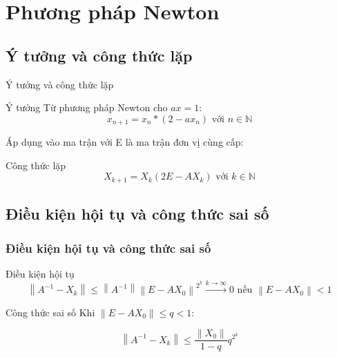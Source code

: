 \section{Phương pháp Newton}
\subsection{Ý tưởng và công thức lặp}
    \begin{frame}{Ý tưởng và công thức lặp}

        \begin{block}{Ý tưởng}
            Từ phương pháp Newton cho $ax = 1$:
            $$ x_{n+1} = x_{n} * (2 - ax_{n}) \text{ với } n \in \mathbb{N} $$
        \end{block}

        Áp dụng vào ma trận với E là ma trận đơn vị cùng cấp:
        \begin{block}{Công thức lặp}
            $$ X_{k+1} = X_{k}(2E - AX_{k}) \text{ với } k \in \mathbb{N} $$
        \end{block}

    \end{frame}

\subsection{Điều kiện hội tụ và công thức sai số}

    \begin{frame}
        \frametitle{Điều kiện hội tụ và công thức sai số}
        
        \begin{block}{Điều kiện hội tụ}
            $$ \left\lVert A^{-1} - X_{k} \right\rVert \leq \left\lVert A^{-1} \right\rVert \left\lVert E - AX_{0} \right\rVert ^{2^{k}} \xrightarrow{k \to \infty} 0 \text{ nếu }  \left\lVert E - AX_{0} \right\rVert < 1 $$
        \end{block}

        \begin{block}{Công thức sai số}
            Khi $\left\lVert E - AX_{0} \right\rVert \leq q < 1$: 

            $$ \left\lVert A^{-1} - X_{k} \right\rVert \leq \frac{\left\lVert X_{0} \right\rVert}{1 - q} q^{2^{k}}  $$
        \end{block}
    
    \end{frame}

